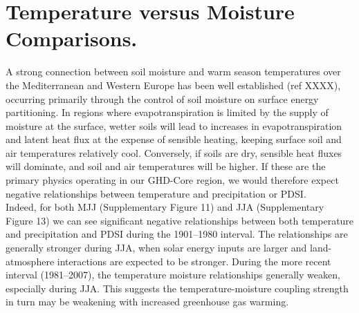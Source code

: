 \documentclass[12pt]{article}
\begin{document}
\section*{Temperature versus Moisture Comparisons.}
\noindent A strong connection between soil moisture and warm season temperatures over the Mediterranean and Western Europe has been well established (ref XXXX), occurring primarily through the control of soil moisture on surface energy partitioning. In regions where evapotranspiration is limited by the supply of moisture at the surface, wetter soils will lead to increases in evapotranspiration and latent heat flux at the expense of sensible heating, keeping surface soil and air temperatures relatively cool. Conversely, if soils are dry, sensible heat fluxes will dominate, and soil and air temperatures will be higher. If these are the primary physics operating in our GHD-Core region, we would therefore expect negative relationships between temperature and precipitation or PDSI.\\
\indent Indeed, for both MJJ (Supplementary Figure 11) and JJA (Supplementary Figure 13) we can see significant negative relationships between both temperature and precipitation and PDSI during the 1901--1980 interval. The relationships are generally stronger during JJA, when solar energy inputs are larger and land-atmosphere interactions are expected to be stronger. During the more recent interval (1981--2007), the temperature moisture relationships generally weaken, especially during JJA. This suggests the temperature-moisture coupling strength in turn may be weakening with increased greenhouse gas warming.
\end{document}
